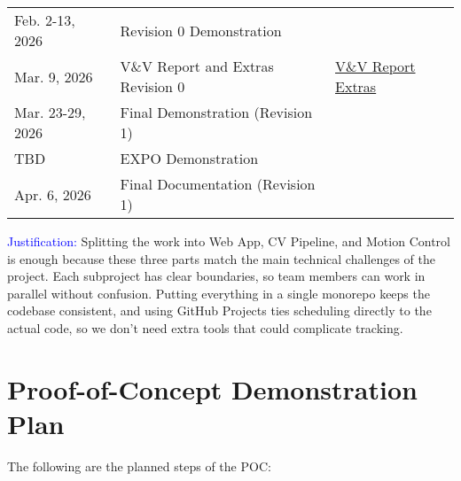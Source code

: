 \documentclass{article}
\begin{document}
\begin{table}[h]
\begin{tabularx}{\textwidth}{llX}
    Feb. 2-13, 2026  & Revision 0 Demonstration                      &                                                                                                                                                  \\
    Mar. 9, 2026     & V\&V Report and Extras Revision 0             & \href{https://github.com/ZifanSi/vision-guided-tracker/blob/main/docs/VnVReport/VnVReport.pdf}{V\&V Report}   \newline
    \href{https://github.com/ZifanSi/vision-guided-tracker/tree/main/docs/Extras}{Extras}
    \\
    Mar. 23-29, 2026 & Final Demonstration (Revision 1)              &                                                                                                                                                  \\
    TBD              & EXPO Demonstration                            &                                                                                                                                                  \\
    Apr. 6, 2026     & Final Documentation (Revision 1)              &                                                                                                                                                  \\
    \bottomrule
  \end{tabularx}
\end{table}
\FloatBarrier

\textcolor{blue}{Justification:} Splitting the work into Web App, CV Pipeline,
and Motion Control is enough because these three parts match the main technical
challenges of the project. Each subproject has clear boundaries, so team members
can work in parallel without confusion. Putting everything in a single monorepo
keeps the codebase consistent, and using GitHub Projects ties scheduling directly
to the actual code, so we don’t need extra tools that could complicate tracking.


\section{Proof-of-Concept Demonstration Plan}

The following are the planned steps of the POC:
\end{document}
